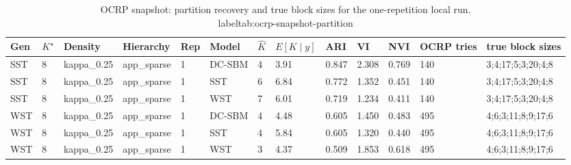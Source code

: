 \begin{table}[!h]
\centering
\caption{OCRP snapshot: partition recovery and true block sizes for the one-repetition local run.\\label{tab:ocrp-snapshot-partition}}
\centering
\begin{tabular}[t]{lllllllllllll}
\toprule
Gen & $K^\star$ & Density & Hierarchy & Rep & Model & $\hat K$ & $E[K\mid y]$ & ARI & VI & NVI & OCRP tries & true block sizes\\
\midrule
SST & 8 & kappa_0.25 & app_sparse & 1 & DC-SBM & 4 & 3.91 & 0.847 & 2.308 & 0.769 & 140 & 3;4;17;5;3;20;4;8\\
SST & 8 & kappa_0.25 & app_sparse & 1 & SST & 6 & 6.84 & 0.772 & 1.352 & 0.451 & 140 & 3;4;17;5;3;20;4;8\\
SST & 8 & kappa_0.25 & app_sparse & 1 & WST & 7 & 6.01 & 0.719 & 1.234 & 0.411 & 140 & 3;4;17;5;3;20;4;8\\
WST & 8 & kappa_0.25 & app_sparse & 1 & DC-SBM & 4 & 4.48 & 0.605 & 1.450 & 0.483 & 495 & 4;6;3;11;8;9;17;6\\
WST & 8 & kappa_0.25 & app_sparse & 1 & SST & 4 & 5.84 & 0.605 & 1.320 & 0.440 & 495 & 4;6;3;11;8;9;17;6\\
WST & 8 & kappa_0.25 & app_sparse & 1 & WST & 3 & 4.37 & 0.509 & 1.853 & 0.618 & 495 & 4;6;3;11;8;9;17;6\\
\bottomrule
\end{tabular}
\end{table}

